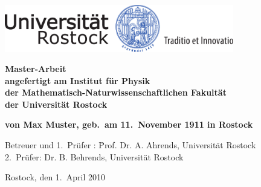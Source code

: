 
\thispagestyle{empty}
\begin{center}
\vspace*{-2cm}
\includegraphics[width=0.75\textwidth]{unilogo-siegel-farbe}\\
\vspace*{3cm}
    {\titlefont \huge \onehalfspacing
	\thetitle 
    \par}%
   \vfill
    {\normalfont\normalcolor\bfseries
	\large
	Master-Arbeit \\
	\large
	angefertigt am Institut für Physik\\
	der Mathematisch-Naturwissenschaftlichen Fakultät\\
	der Universität Rostock
    \par}%
\end{center}\par
\vspace*{1cm}
\noindent\begin{minipage}[b]{\textwidth}
{\bf
\noindent von Max Muster, geb.~am 11.~November 1911 in Rostock\\
\vspace*{1.5cm}

	\begin{tabbing}
	Betreuer und 1.~Pr\"ufer :  \= Prof. Dr. A. Ahrends, Universität Rostock\\
	2.~Pr\"ufer: \> Dr. B. Behrends, Universität Rostock \\
	\end{tabbing}

  \noindent Rostock, den  1.~April 2010
  \par
  }
\end{minipage}


